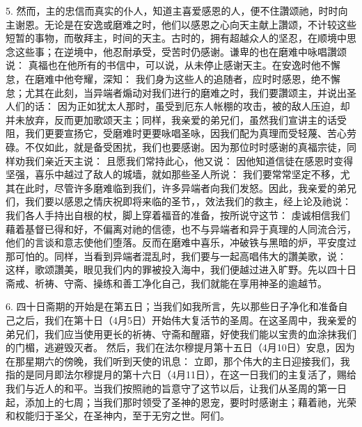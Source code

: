 5. 然而，主的忠信而真实的仆人，知道主喜爱感恩的人，便不住讚颂祂，时时向主谢恩。无论是在安逸或磨难之时，他们以感恩之心向天主献上讚颂，不计较这些短暂的事物，而敬拜主，时间的天主。古时的，拥有超越众人的坚忍，在顺境中思念这些事；在逆境中，他忍耐承受，受苦时仍感谢。谦卑的也在磨难中咏唱讚颂说： 真福也在他所有的书信中，可以说，从未停止感谢天主。在安逸时他不懈怠，在磨难中他夸耀，深知： 我们身为这些人的追随者，应时时感恩，绝不懈怠；尤其在此刻，当异端者煽动对我们进行的磨难之时，我们要讚颂主，并说出圣人们的话： 因为正如犹太人那时，虽受到厄东人帐棚的攻击，被的敌人压迫，却并未放弃，反而更加歌颂天主；同样，我亲爱的弟兄们，虽然我们宣讲主的话受阻，我们更要宣扬它，受磨难时更要咏唱圣咏，因我们配为真理而受轻蔑、苦心劳碌。不仅如此，就是备受困扰，我们也要感谢。因为那位时时感谢的真福宗徒，同样劝我们亲近天主说： 且愿我们常持此心，他又说： 因他知道信徒在感恩时变得坚强，喜乐中越过了敌人的城墙，就如那些圣人所说： 我们要常常坚定不移，尤其在此时，尽管许多磨难临到我们，许多异端者向我们发怒。因此，我亲爱的弟兄们，我们要以感恩之情庆祝即将来临的圣节，，效法我们的救主，经上论及祂说： 我们各人手持出自根的杖，脚上穿着福音的准备，按所说守这节： 虔诚相信我们藉着基督已得和好，不偏离对祂的信德，也不与异端者和异于真理的人同流合污，他们的言谈和意志使他们堕落。反而在磨难中喜乐，冲破铁与黑暗的炉，平安度过那可怕的。同样，当看到异端者混乱时，我们要与一起高唱伟大的讚美歌，说： 这样，歌颂讚美，眼见我们内的罪被投入海中，我们便越过进入旷野。先以四十日斋戒、祈祷、守斋、操练和善工净化自己，我们就能在享用神圣的逾越节。\par

6. 四十日斋期的开始是在第五日；当我们如我所言，先以那些日子净化和准备自己之后，我们在第十日（4月5日）开始伟大复活节的圣周。在这圣周中，我亲爱的弟兄们，我们应当使用更长的祈祷、守斋和醒寤，好使我们能以宝贵的血涂抹我们的门楣，逃避毁灭者。 然后，我们在法尔穆提月第十五日（4月10日）安息，因为在那星期六的傍晚，我们听到天使的讯息： 立即，那个伟大的主日迎接我们，我指的是同月即法尔穆提月的第十六日（4月11日），在这一日我们的主复活了，赐给我们与近人的和平。当我们按照祂的旨意守了这节以后，让我们从圣周的第一日起，添加上的七周；当我们那时领受了圣神的恩宠，要时时感谢主；藉着祂，光荣和权能归于圣父，在圣神内，至于无穷之世。阿们。\par

